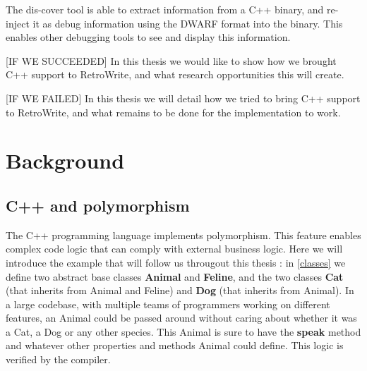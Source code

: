 \documentclass[a4paper,11pt,oneside]{report}
\begin{document}
The dis-cover tool is able to extract information from a C++ binary, and re-inject it as debug information using the DWARF format into the binary.
This enables other debugging tools to see and display this information.







[IF WE SUCCEEDED]
In this thesis we would like to show how we brought C++ support to RetroWrite, and what research opportunities this will create.

[IF WE FAILED]
In this thesis we will detail how we tried to bring C++ support to RetroWrite, and what remains to be done for the implementation to work.


\chapter{Background}



\section{C++ and polymorphism}

The C++ programming language implements polymorphism.
This feature enables complex code logic that can comply with external business logic.
Here we will introduce the example that will follow us througout this thesis :
in \autoref{classes} we define two abstract base classes \textbf{Animal} and \textbf{Feline},
and the two classes \textbf{Cat} (that inherits from Animal and Feline) and \textbf{Dog} (that inherits from Animal).
In a large codebase, with multiple teams of programmers working on different features,
an Animal could be passed around without caring about whether it was a Cat, a Dog or any other species.
This Animal is sure to have the \textbf{speak} method and whatever other properties and methods Animal could define.
This logic is verified by the compiler.
\end{document}
